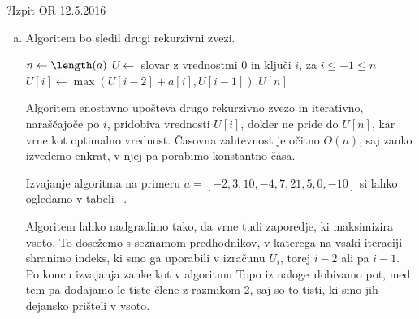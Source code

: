 \begin{naloga}{?}{Izpit OR 12.5.2016}
\begin{odgovor}
\begin{enumerate}[(a)]
Ideja tega rekurzivnega zapisa je podobna zgornji,
le da se namesto iska\-nja maksimuma odloči,
če bo $i$-ti člen vključila v vsoto oziroma ga bo izpustila.

Vrstni red iskanja vrednosti $U_i$ določimo z naraščajočim zaporedjem indeksov $i$, ko $1\leq i \leq n$, 
saj imamo tako pred reševanjem problema $U_i$ definirane vse vrednosti prej.
Ko izračunamo vse vrednosti $U_i$, je maximum vsote zaporedja enak $U_n$,
kar sledi neposredno iz definicije vrednosti $U_n$.

\item Algoritem bo sledil drugi rekurzivni zvezi.

\begin{small}
\begin{algorithmic}
	\State $n \gets \length(a)$
	\State $U \gets$ slovar z vrednostmi $0$ in ključi $i$, za $i \leq -1 \leq n$
		\State $U[i] \gets \max(U[i-2] + a[i], U[i-1])$
	\EndFor
	\Return $U[n]$
\EndFunction
\end{algorithmic}
\end{small}

Algoritem enostavno upošteva drugo rekurzivno zvezo in iterativno, naraščajoče po $i$, pridobiva 
vrednosti $U[i]$, dokler ne pride do $U[n]$, kar vrne kot optimalno vrednost.
Časovna zahtevnost je očitno $O(n)$, saj zanko izvedemo enkrat, v njej pa porabimo konstantno časa.

Izvajanje algoritma na primeru $a = [-2, 3, 10, -4, 7, 21, 5, 0, -10]$ si lahko ogledamo v tabeli ~\tab.

Algoritem lahko nadgradimo tako, da vrne tudi zaporedje, ki maksimizira vsoto.
To dosežemo s seznamom predhodnikov, v katerega na vsaki iteraciji shranimo indeks, ki smo ga uporabili v izračunu $U_i$, torej $i-2$ ali pa $i-1$.
Po koncu  izvajanja zanke kot v algoritmu {\sc Topo} iz naloge~\res[topo] dobivamo pot, med tem pa dodajamo le tiste člene z razmikom 2, 
saj so to tisti, ki smo jih dejansko prišteli v vsoto.


\end{enumerate}
\end{odgovor}
\end{naloga}
